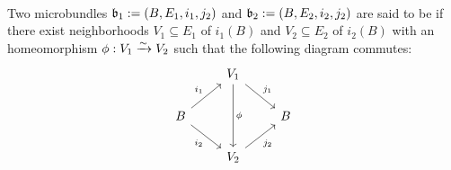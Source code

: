 \\ Two microbundles $\mathfrak{b}_1 := (B, E_1, i_1, j_2)$ and $\mathfrak{b}_2 := (B, E_2, i_2, j_2)$ are said to be  if there exist neighborhoods $V_1 \subseteq E_1$ of $i_1(B)$ and $V_2 \subseteq E_2$ of $i_2(B)$ with an homeomorphism $\phi: V_1 \xrightarrow{\sim} V_2$ such that the following diagram commutes: 
\[\begin{tikzcd}
    & V_1 \ar[dr, "j_1"] \ar[dd, "\phi"] & \\
    B \ar[ur, "i_1"] \ar[dr, "i_2"'] & & B \\
    & V_2 \ar[ur, "j_2"'] &
\end{tikzcd}\]
